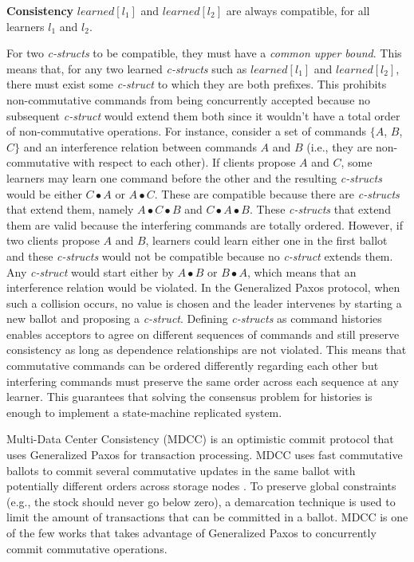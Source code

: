 \documentclass[runningheads,a4paper]{llncs}
\begin{document}
\textbf{Consistency} $learned[l_1]$ and $learned[l_2]$ are always compatible, for all learners $l_1$ and $l_2$. \par
For two \textit{c-structs} to be compatible, they must have a \textit{common upper bound}. This means that, for any two learned \textit{c-structs} such as $learned[l_1]$ and $learned[l_2]$, there must exist some \textit{c-struct} to which they are both prefixes. This prohibits non-commutative commands from being concurrently accepted because no subsequent \textit{c-struct} would extend them both since it wouldn't have a total order of non-commutative operations. For instance, consider a set of commands $\lbrace A$, $B$, $C\rbrace$ and an interference relation between commands $A$ and $B$ (i.e., they are non-commutative with respect to each other). If clients propose $A$ and $C$, some learners may learn one command before the other and the resulting \textit{c-structs} would be either $C \bullet A$ or $A \bullet C$. These are compatible because there are \textit{c-structs} that extend them, namely $A \bullet C \bullet B$ and $C \bullet A \bullet B$. These \textit{c-structs} that extend them are valid because the interfering commands are totally ordered. However, if two clients propose $A$ and $B$, learners could learn either one in the first ballot and these \textit{c-structs} would not be compatible because no \textit{c-struct} extends them. Any \textit{c-struct} would start either by $A \bullet B$ or $B \bullet A$, which means that an interference relation would be violated. In the Generalized Paxos protocol, when such a collision occurs, no value is chosen and the leader intervenes by starting a new ballot and proposing a \textit{c-struct}. Defining \textit{c-structs} as command histories enables acceptors to agree on different sequences of commands and still preserve consistency as long as dependence relationships are not violated. This means that commutative commands can be ordered differently regarding each other but interfering commands must preserve the same order across each sequence at any learner. This guarantees that solving the consensus problem for histories is enough to implement a state-machine replicated system. \par
Multi-Data Center Consistency (MDCC) is an optimistic commit protocol that uses Generalized Paxos for transaction processing. MDCC uses fast commutative ballots to commit several commutative updates in the same ballot with potentially different orders across storage nodes \cite{Kraska2013}. To preserve global constraints (e.g., the stock should never go below zero), a demarcation technique is used to limit the amount of transactions that can be committed in a ballot. MDCC is one of the few works that takes advantage of Generalized Paxos to concurrently commit commutative operations.\par
\end{document}
